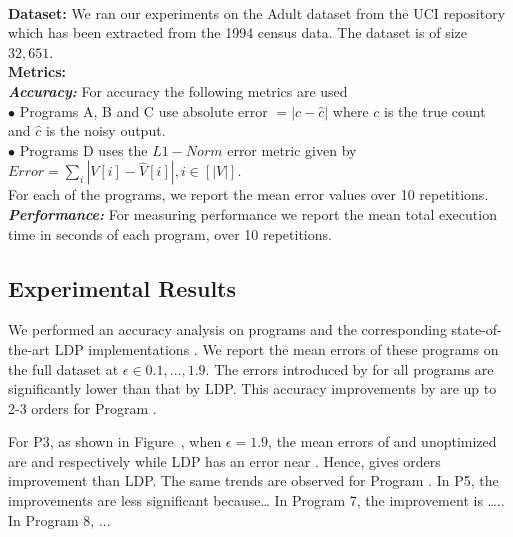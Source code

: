 {\\\textbf{Dataset:}
We ran our experiments on the Adult dataset from the UCI repository \cite{UCI}  which has been extracted from the 1994 census data. The dataset is of size $32,651$.
\\\textbf{Metrics:}
\\\textbf{\textit{Accuracy:}} For accuracy the following metrics are used
\\$\bullet$ Programs A, B and C use absolute error $ =|c-\hat{c}|$ where $c$ is the true count and $\hat{c}$ is the noisy output.\\ $\bullet$ Programs D uses the $L1-Norm$ error metric given  by $Error=\sum_{i}|V[i]-\hat{V}[i]|, i \in [|V|]$.\\
For each of the programs, we report the mean error values over 10 repetitions.\\
\textbf{\textit{Performance:}} For measuring performance we report the mean total execution time in seconds of each program, over 10 repetitions. 
}



\subsection{Experimental Results}\label{sec:results}
 We performed an accuracy analysis on \system programs and the corresponding state-of-the-art \textsf{LDP} implementations \cite{LDP1}. We report the mean errors of these programs on the full dataset at $\epsilon \in {0.1,\ldots,1.9}$. The errors introduced by \system for all programs are significantly lower than that by LDP. This accuracy improvements by \system are up to 2-3 orders for Program .

For P3, as shown in Figure~\cite{fig:accuracy}, when $\epsilon = 1.9$, the mean errors of \system and unoptimized \system are  and   respectively  while LDP has an error near . Hence, \system gives  orders improvement than LDP. The same trends are observed for Program \xh{}. In P5, the improvements are less significant because…  In Program 7, the improvement is ….. In Program 8, ...

